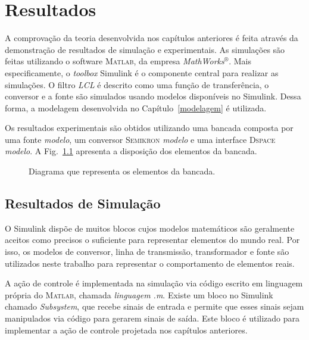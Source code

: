 
\chapter{Resultados}\label{resultados}

    A comprovação da teoria desenvolvida nos capítulos anteriores é feita através da demonstração de resultados de simulação e experimentais. As simulações são feitas utilizando o software \textsc{Matlab}, da empresa \textit{MathWorks}$^\circledR$. Mais especificamente, o \textit{toolbox} Simulink é o componente central para realizar as simulações. O filtro \textit{LCL} é descrito como uma função de transferência, o conversor e a fonte são simulados usando modelos disponíveis no Simulink. Dessa forma, a modelagem desenvolvida no Capítulo~\ref{modelagem} é utilizada.

    Os resultados experimentais são obtidos utilizando uma bancada composta por uma fonte \textit{modelo}, um conversor \textsc{Semikron} \textit{modelo} e uma interface \textsc{Dspace} \textit{modelo}. A Fig.~\ref{fig:topologia_bancada} apresenta a disposição dos elementos da bancada.

    \begin{figure}[htb]
        \centering{
            \def\svgwidth{0.9\textwidth}
            }
        \renewcommand\figurename{Fig.}
        \caption{Diagrama que representa os elementos da bancada.}
        \label{fig:topologia_bancada}
    \end{figure}


\section{Resultados de Simulação}

	O Simulink dispõe de muitos blocos cujos modelos matemáticos são geralmente aceitos como precisos o suficiente para representar elementos do mundo real. Por isso, os modelos de conversor, linha de transmissão, transformador e fonte são utilizados neste trabalho para representar o comportamento de elementos reais.

	A ação de controle é implementada na simulação via código escrito em linguagem própria do \textsc{Matlab}, chamada \textit{linguagem .m}. Existe um bloco no Simulink chamado \textit{Subsystem}, que recebe sinais de entrada e permite que esses sinais sejam manipulados via código para gerarem sinais de saída. Este bloco é utilizado para implementar a ação de controle projetada nos capítulos anteriores.


